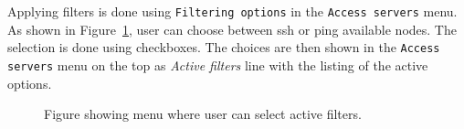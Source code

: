 {{{{\begin{table}[htb]
\centering
\caption{Structure and examples of availability table for filtering functionality.}
\label{table:availability}
\end{table}

Applying filters is done using \texttt{Filtering options} in the \texttt{Access servers} menu. As shown in Figure~\ref{fig:filtering}, user can choose between ssh or ping available nodes. The selection is done using checkboxes. The choices are then shown in the  \texttt{Access servers} menu on the top as \textit{Active filters} line with the listing of the active options. \\

\begin{figure}[H]
	\centering
	\caption{Figure showing menu where user can select active filters.}
	\label{fig:filtering}
\end{figure}

}}}}

